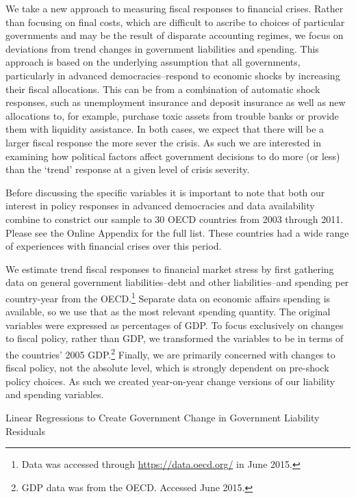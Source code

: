 \documentclass[]{article}
\begin{document}
We take a new approach to measuring fiscal responses to financial crises. Rather than focusing on final costs, which are difficult to ascribe to choices of particular governments and may be the result of disparate accounting regimes, we focus on deviations from trend changes in government liabilities and spending. This approach is based on the underlying assumption that all governments, particularly in advanced democracies--respond to economic shocks by increasing their fiscal allocations. This can be from a combination of automatic shock responses, such as unemployment insurance and deposit insurance as well as new allocations to, for example, purchase toxic assets from trouble banks or provide them with liquidity assistance. In both cases, we expect that there will be a larger fiscal response the more sever the crisis. As such we are interested in examining how political factors affect government decisions to do more (or less) than the `trend' response at a given level of crisis severity.

Before discussing the specific variables it is important to note that both our interest in policy responses in advanced democracies and data availability combine to constrict our sample to 30 OECD countries from 2003 through 2011. Please see the Online Appendix for the full list. These countries had a wide range of experiences with financial crises over this period.

We estimate trend fiscal responses to financial market stress by first gathering data on general government liabilities--debt and other liabilities--and spending per country-year from the OECD.\footnote{Data was accessed through \url{https://data.oecd.org/} in June 2015.} Separate data on economic affairs spending is available, so we use that as the most relevant spending quantity. The original variables were expressed as percentages of GDP. To focus exclusively on changes to fiscal policy, rather than GDP, we transformed the variables to be in terms of the countries' 2005 GDP.\footnote{GDP data was from the OECD. Accessed June 2015.} Finally, we are primarily concerned with changes to fiscal policy, not the absolute level, which is strongly dependent on pre-shock policy choices. As such we created year-on-year change versions of our liability and spending variables.

\begin{table}
    \caption{Linear Regressions to Create Government Change in Government Liability Residuals}
    \label{liab_resid}

    \begin{center}
        
    \end{center}

\end{table}
\end{document}
